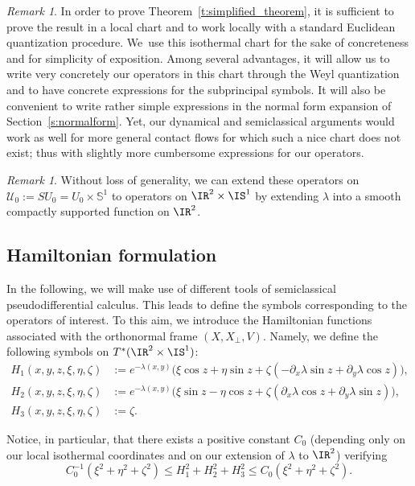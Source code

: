 \documentclass[10pt]{amsart}
\theoremstyle{plain}
\theoremstyle{definition}
\theoremstyle{remark}
\newtheorem{rema}[theo]{Remark}
\begin{document}
\begin{rema} In order to prove Theorem~\ref{t:simplified_theorem}, it is sufficient to prove the result in a local chart and to work locally with a standard Euclidean quantization procedure. We~use this isothermal chart for the sake of concreteness and for simplicity of exposition. Among several advantages, it will allow us to write very concretely our operators in this chart through the Weyl quantization and to have concrete expressions for the subprincipal symbols. It will also be convenient to write rather simple expressions in the normal form expansion of Section~\ref{s:normalform}. Yet, our dynamical and semiclassical arguments would work as well for more general contact flows for which such a nice chart does not exist; thus with slightly more cumbersome expressions for our operators.
\end{rema}

\begin{rema} Without loss of generality, we can extend these operators on $\mathcal{U}_0:=SU_0=U_0\times\mathbb{S}^1$ to operators on $\IR^2\times\IS^1$ by extending $\lambda$ into a smooth compactly supported function on $\IR^2$.
\end{rema}

\subsection{Hamiltonian formulation}
\label{s:hamiltonian_formalism}

In the following, we will make use of different tools of semiclassical pseudodifferential calculus. This leads to define the symbols corresponding to the operators of interest. To this aim, we introduce the Hamiltonian functions associated with the orthonormal frame $(X,X_\perp, V)$. Namely, we define the following symbols on $T^*(\IR^2\times\IS^1)$:
\begin{align*}
H_1(x,y,z,\xi,\eta,\zeta)&:=e^{-\lambda(x,y)}\bigl(\xi\cos z+\eta\sin z+\zeta(-\partial_x\lambda\sin z +\partial_y\lambda \cos z)\bigr),
\\
H_2(x,y,z,\xi,\eta,\zeta)&:=e^{-\lambda(x,y)}\bigl(\xi\sin z-\eta\cos z+\zeta(\partial_x\lambda\cos z +\partial_y\lambda \sin z)\bigr),\\
\tag*{and}
H_3(x,y,z,\xi,\eta,\zeta)&:=\zeta.
\end{align*}

Notice, in particular, that there exists a positive constant $C_0$ (depending only on our local isothermal coordinates and on our extension of $\lambda$ to $\IR^2$) verifying
\begin{equation}\label{e-norm-comparison}C_0^{-1}(\xi^2+\eta^2+\zeta^2)\leq H_1^2+H_2^2+H_3^2\leq C_0 (\xi^2+\eta^2+\zeta^2).\end{equation}
\end{document}
